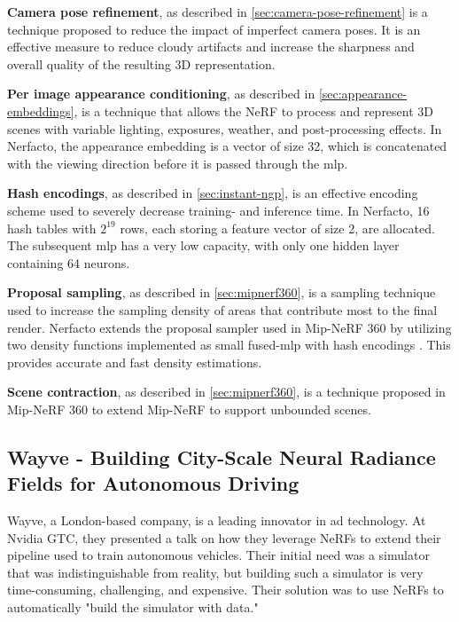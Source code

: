 

\textbf{Camera pose refinement}, as described in \autoref{sec:camera-pose-refinement} is a technique proposed to reduce the impact of imperfect camera poses. It is an effective measure to reduce cloudy artifacts and increase the sharpness and overall quality of the resulting 3D representation.

\textbf{Per image appearance conditioning}, as described in \autoref{sec:appearance-embeddings}, is a technique that allows the NeRF to process and represent 3D scenes with variable lighting, exposures, weather, and post-processing effects. In Nerfacto, the appearance embedding is a vector of size 32, which is concatenated with the viewing direction before it is passed through the \acrshort{mlp}.

\textbf{Hash encodings}, as described in \autoref{sec:instant-ngp}, is an effective encoding scheme used to severely decrease training- and inference time. In Nerfacto, 16 hash tables with $2^{19}$ rows, each storing a feature vector of size 2, are allocated. The subsequent \acrshort{mlp} has a very low capacity, with only one hidden layer containing 64 neurons.

\textbf{Proposal sampling}, as described in \autoref{sec:mipnerf360}, is a sampling technique used to increase the sampling density of areas that contribute most to the final render. Nerfacto extends the proposal sampler used in Mip-NeRF 360 \cite{barron_mip-nerf_2022} by utilizing two density functions implemented as small fused-\acrshort{mlp} with hash encodings \cite{muller_instant_2022}. This provides accurate and fast density estimations.

\textbf{Scene contraction}, as described in \autoref{sec:mipnerf360}, is a technique proposed in Mip-NeRF 360 \cite{barron_mip-nerf_2022} to extend Mip-NeRF to support unbounded scenes.




\subsection[Wayve - NeRFs for Autonomous Driving]{Wayve - Building City-Scale Neural Radiance Fields for Autonomous Driving} \label{sec:wayve}
Wayve, a London-based company, is a leading innovator in \acrshort{ad} technology. At Nvidia GTC, they presented a talk on how they leverage NeRFs to extend their pipeline used to train autonomous vehicles. Their initial need was a simulator that was indistinguishable from reality, but building such a simulator is very time-consuming, challenging, and expensive. Their solution was to use NeRFs to automatically "build the simulator with data."

